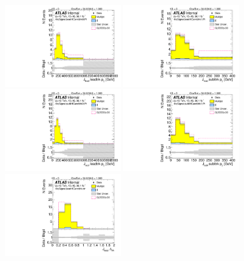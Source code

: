 \begin{figure}[htbp!]
\begin{center}
\includegraphics[angle=270, width=0.45\textwidth]{./figures/boosted/Signal/b77_FourTag_Signal_leadHCand_trk0_Pt_blind.pdf}
\includegraphics[angle=270, width=0.45\textwidth]{./figures/boosted/Signal/b77_FourTag_Signal_leadHCand_trk1_Pt_blind.pdf}\\
\includegraphics[angle=270, width=0.45\textwidth]{./figures/boosted/Signal/b77_FourTag_Signal_sublHCand_trk0_Pt_blind.pdf}
\includegraphics[angle=270, width=0.45\textwidth]{./figures/boosted/Signal/b77_FourTag_Signal_sublHCand_trk1_Pt_blind.pdf}\\
\includegraphics[angle=270, width=0.45\textwidth]{./figures/boosted/Signal/b77_FourTag_Signal_leadHCand_trk_dr_blind.pdf}

\end{center}
\end{figure}

